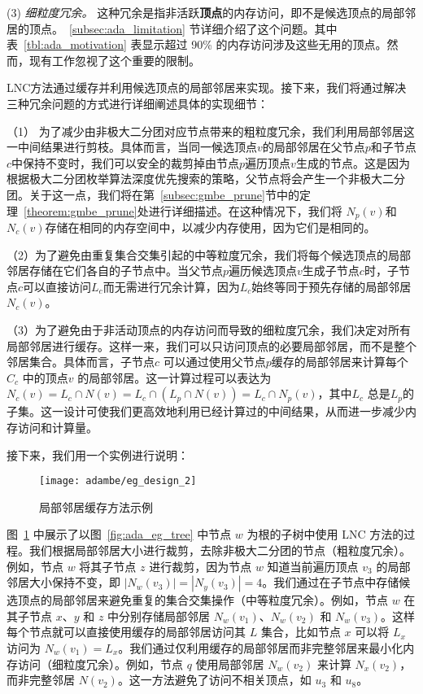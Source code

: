 (3) \emph{\textit{细粒度冗余。}}
这种冗余是指非活跃\textbf{顶点}的内存访问，即不是候选顶点的局部邻居的顶点。~\ref{subsec:ada_limitation} 节详细介绍了这个问题。其中表~\ref{tbl:ada_motivation} 表显示超过 90\% 的内存访问涉及这些无用的顶点。然而，现有工作忽视了这个重要的限制。

LNC方法通过缓存并利用候选顶点的局部邻居来实现。接下来，我们将通过解决三种冗余问题的方式进行详细阐述具体的实现细节：

（1） 为了减少由非极大二分团对应节点带来的粗粒度冗余，我们利用局部邻居这一中间结果进行剪枝。具体而言，当同一候选顶点$v$的局部邻居在父节点$p$和子节点$c$中保持不变时，我们可以安全的裁剪掉由节点$p$遍历顶点$v$生成的节点。这是因为根据极大二分团枚举算法深度优先搜索的策略，父节点将会产生一个非极大二分团。关于这一点，我们将在第~\ref{subsec:gmbe_prune}节中的定理~\ref{theorem:gmbe_prune}处进行详细描述。在这种情况下，我们将 $N_p(v)$和$N_c(v)$存储在相同的内存空间中，以减少内存使用，因为它们是相同的。

（2）为了避免由重复集合交集引起的中等粒度冗余，我们将每个候选顶点的局部邻居存储在它们各自的子节点中。当父节点$p$遍历候选顶点$v$生成子节点$c$时，子节点$c$可以直接访问$L_c$而无需进行冗余计算，因为$L_c$始终等同于预先存储的局部邻居 $N_c(v)$。

（3）为了避免由于非活动顶点的内存访问而导致的细粒度冗余，我们决定对所有局部邻居进行缓存。这样一来，我们可以只访问顶点的必要局部邻居，而不是整个邻居集合。具体而言，子节点$c$ 可以通过使用父节点$p$缓存的局部邻居来计算每个$C_c$ 中的顶点$v$ 的局部邻居。这一计算过程可以表达为$N_c(v) = L_c \cap N(v) = L_c \cap (L_p \cap N(v)) = L_c \cap N_p(v)$，其中$L_c$ 总是$L_p$的子集。这一设计可使我们更高效地利用已经计算过的中间结果，从而进一步减少内存访问和计算量。

接下来，我们用一个实例进行说明：

\begin{figure} [H]
	\centering
  \vspace{0.05in}
	\texttt{[image: adambe/eg\_design\_2]}
	\caption{局部邻居缓存方法示例}

	\label{fig:ada_design2}
\end{figure}

\begin{example}
  图~\ref{fig:ada_design2} 中展示了以图~\ref{fig:ada_eg_tree} 中节点 $w$ 为根的子树中使用 LNC 方法的过程。我们根据局部邻居大小进行裁剪，去除非极大二分团的节点（粗粒度冗余）。例如，节点 $w$ 将其子节点 $z$ 进行裁剪，因为节点 $w$ 知道当前遍历顶点 $v_3$ 的局部邻居大小保持不变，即 $|N_w(v_3)| = |N_y(v_3)| = 4$。我们通过在子节点中存储候选顶点的局部邻居来避免重复的集合交集操作（中等粒度冗余）。例如，节点 $w$ 在其子节点 $x$、$y$ 和 $z$ 中分别存储局部邻居 $N_w(v_1)$、$N_w(v_2)$ 和 $N_w(v_3)$。这样每个节点就可以直接使用缓存的局部邻居访问其 $L$ 集合，比如节点 $x$ 可以将 $L_x$ 访问为 $N_w(v_1)=L_x$。我们通过仅利用缓存的局部邻居而非完整邻居来最小化内存访问（细粒度冗余）。例如，节点 $q$ 使用局部邻居 $N_w(v_2)$ 来计算 $N_x(v_2)$，而非完整邻居 $N(v_2)$。这一方法避免了访问不相关顶点，如 $u_3$ 和 $u_8$。
\end{example}


